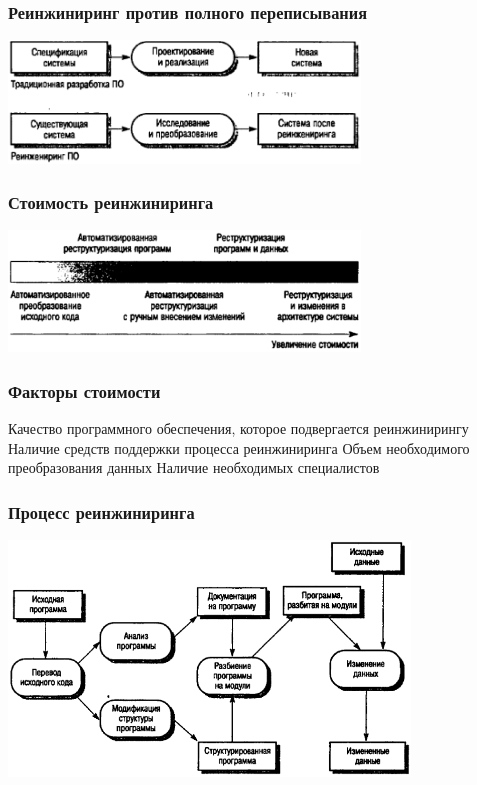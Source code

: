 \documentclass{../../slides-style}
\begin{document}
    \begin{frame}
        \frametitle{Реинжиниринг против полного переписывания}
        \begin{center}
            \includegraphics[width=0.7\textwidth]{developmentVsReengineering.png}
        \end{center}
    \end{frame}

    \begin{frame}
        \frametitle{Стоимость реинжиниринга}
        \begin{center}
            \includegraphics[width=0.7\textwidth]{reengineeringAutomation.png}
        \end{center}
    \end{frame}

    \begin{frame}
        \frametitle{Факторы стоимости}
        \begin{outline}
            \1 Качество программного обеспечения, которое подвергается реинжинирингу
            \1 Наличие средств поддержки процесса реинжиниринга
            \1 Объем необходимого преобразования данных
            \1 Наличие необходимых специалистов
        \end{outline}
    \end{frame}

    \begin{frame}
        \frametitle{Процесс реинжиниринга}
        \begin{center}
            \includegraphics[width=0.8\textwidth]{reengineeringProcess.png}
        \end{center}
    \end{frame}
\end{document}
